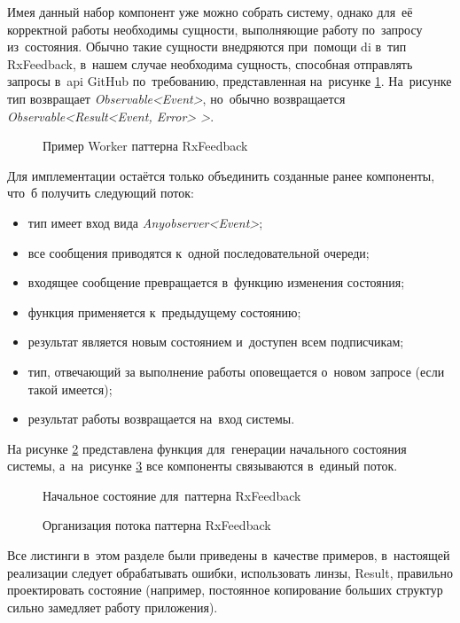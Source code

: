 Имея данный набор компонент уже можно собрать систему, однако для~её корректной работы необходимы сущности, выполняющие работу по~запросу из~состояния. Обычно такие сущности внедряются при~помощи \gls{di} в~тип RxFeedback, в~нашем случае необходима сущность, способная отправлять запросы в~\gls{api} GitHub по~требованию, представленная на~рисунке \ref{sec:development:arch:ios:rxfeedback:example:worker}. На~рисунке тип возвращает \textit{Observable<Event>}, но~обычно возвращается \textit{Observable<Result<Event, Error> >}.

\begin{figure}[h]
  
   \caption{Пример Worker паттерна RxFeedback}
   \label{sec:development:arch:ios:rxfeedback:example:worker}
\end{figure}

Для имплементации остаётся только объединить созданные ранее компоненты, что~б получить следующий поток:

\begin{itemize}
  \item тип имеет вход вида \textit{Any\gls{observer}<Event>};
  \item все сообщения приводятся к~одной последовательной очереди;
  \item входящее сообщение превращается в~функцию изменения состояния;
  \item функция применяется к~предыдущему состоянию;
  \item результат является новым состоянием и~доступен всем подписчикам;
  \item тип, отвечающий за выполнение работы оповещается о~новом запросе (если такой имеется);
  \item результат работы возвращается на~вход системы.
\end{itemize}

На рисунке \ref{sec:development:arch:ios:rxfeedback:example:initial-state} представлена функция для~генерации начального состояния системы, а~на~рисунке \ref{sec:development:arch:ios:rxfeedback:example:composition} все компоненты связываются в~единый поток.

\begin{figure}[h]
  
   \caption{Начальное состояние для~паттерна RxFeedback}
   \label{sec:development:arch:ios:rxfeedback:example:initial-state}
\end{figure}

\begin{figure}[h]
  
   \caption{Организация потока паттерна RxFeedback}
   \label{sec:development:arch:ios:rxfeedback:example:composition}
\end{figure}

Все листинги в~этом разделе были приведены в~качестве примеров, в~настоящей реализации следует обрабатывать ошибки, использовать линзы, Result, правильно проектировать состояние (например, постоянное копирование больших структур сильно замедляет работу приложения).